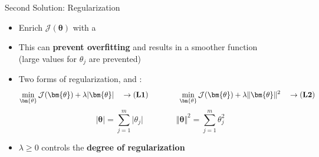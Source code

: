\begin{frame}{Second Solution: Regularization}{}
	\begin{itemize}
		\item Enrich $\mathcal{J}(\bm{\theta})$ with a 
		\item This can \textbf{prevent overfitting} and results in a smoother function \\
			(large values for $\theta_j$ are prevented)
		\item Two forms of regularization,  and :
		\begin{equation*}
			\min_{\bm{\theta}} \mathcal{J}(\bm{\theta}) + \lambda \vert \bm{\theta} \vert
			\quad \rightarrow \text{(\textbf{L1})}
			\qquad\qquad
			\min_{\bm{\theta}} \mathcal{J}(\bm{\theta}) + \lambda \Vert \bm{\theta} \Vert^2
			\quad \rightarrow \text{(\textbf{L2})}
		\end{equation*}
		\vspace*{-3mm}
		\begin{equation*}
			\vert \bm{\theta} \vert = \sum_{j=1}^{m} \vert \theta_j \vert
			\qquad\qquad
			\Vert \bm{\theta} \Vert^2 = \sum_{j=1}^{m} \theta_j^2
		\end{equation*}
		\item $\lambda \ge 0$ controls the \textbf{degree of regularization}
	\end{itemize}
\end{frame}


